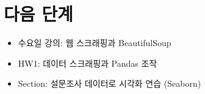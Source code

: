 \documentclass[12pt,a4paper]{article}
\begin{document}
\section{다음 단계}

\begin{itemize}
    \item 수요일 강의: 웹 스크래핑과 BeautifulSoup
    \item HW1: 데이터 스크래핑과 Pandas 조작
    \item Section: 설문조사 데이터로 시각화 연습 (Seaborn)
\end{itemize}
\end{document}

